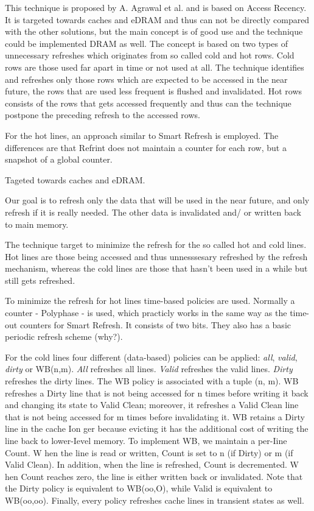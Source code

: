 This technique is proposed by A. Agrawal et al. \cite{refrint} and is based on Access Recency. It is targeted towards caches and eDRAM and thus can not be directly compared with the other solutions, but the main concept is of good use and the technique could be implemented DRAM as well. The concept is based on two types of unnecessary refreshes which originates from so called cold and hot rows. Cold rows are those used far apart in time or not used at all. The technique identifies and refreshes only those rows which are expected to be accessed in the near future, the rows that are used less frequent is flushed and invalidated. Hot rows consists of the rows that gets accessed frequently and thus can the technique postpone the preceding refresh to the accessed rows.

For the hot lines, an approach similar to Smart Refresh is employed. The differences are that Refrint does not maintain a counter for each row, but a snapshot of a global counter. 


Tageted towards caches and eDRAM.

Our goal is to refresh only the data that will be used in the near future, and only refresh if it is really needed. The other data is invalidated and/ or written back to main memory.

The technique target to minimize the refresh for the so called hot and cold lines. Hot lines are those being accessed and thus unnesssesary refreshed by the refresh mechanism, whereas the cold lines are those that hasn't been used in a while but still gets refreshed.

To minimize the refresh for hot lines time-based policies are used. Normally a counter - Polyphase - is used, which practicly works in the same way as the time-out counters for Smart Refresh. It consists of two bits. They also has a basic periodic refresh scheme (why?).

For the cold lines four different (data-based) policies can be applied: \textit{all}, \textit{valid}, \textit{dirty} or WB(n,m). \textit{All} refreshes all lines. \textit{Valid} refreshes the valid lines. \textit{Dirty} refreshes the dirty lines. The WB policy is associated with a tuple (n, m). WB refreshes a Dirty line that is not being accessed for n times before writing it back and changing its state to Valid Clean; moreover, it refreshes a Valid Clean line that is not being accessed for m times before invalidating it. WB retains a Dirty line in the cache Ion ger because evicting it has the additional cost of writing the line back to lower-Ievel memory. To implement WB, we maintain a per-Iine Count. W hen the line is read or written, Count is set to n (if Dirty) or m (if Valid Clean). In addition, when the line is refreshed, Count is decremented. W hen Count reaches zero, the line is either written back or invalidated. Note that the Dirty policy is equivalent to WB(oo,O), while Valid is equivalent to WB(oo,oo). Finally, every policy refreshes cache lines in transient states as well.

